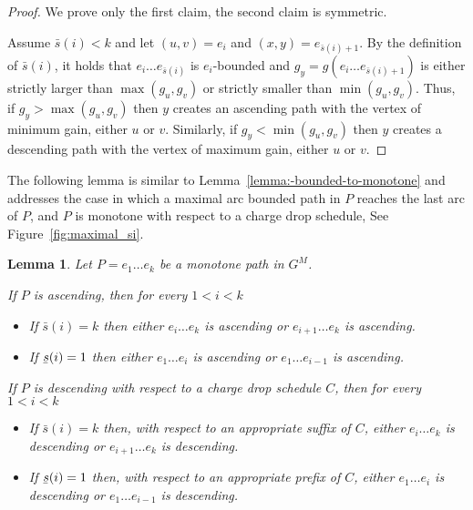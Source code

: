 \documentclass[11pt]{article}
\newtheorem{lemma}[theorem]{Lemma}
\newcommand{\ubar}[1]{\underaccent{\bar}{{#1}}}
\begin{document}
\begin{proof}
    We prove only the first claim, the second claim is symmetric.
    
    Assume $\bar{s}(i) < k$ and let $(u,v)=e_i$ and $(x,y) = e_{\bar{s}(i)+1}$. By the definition of $\bar{s}(i)$, it holds that $e_i \ldots e_{\bar{s}(i)}$ is $e_i$-bounded and $g_{y} = g(e_i \ldots e_{\bar{s}(i)+1})$ is either strictly larger than $\max( g_{u},g_{v})$ or strictly smaller than $\min( g_{u},g_{v})$. Thus, if $g_{y}> \max( g_{u},g_{v})$ then $y$ creates an ascending path with the vertex of minimum gain, either $u$ or $v$. Similarly, if $g_{y}< \min( g_{u},g_{v})$ then $y$ creates a descending path with the vertex of maximum gain, either $u$ or $v$.
\end{proof}

The following lemma is similar to Lemma~\ref{lemma:-bounded-to-monotone} and addresses the case in which a maximal arc bounded path in $P$ reaches the last arc of $P$, and $P$ is monotone with respect to a charge drop schedule, See Figure~\ref{fig:maximal_si}.


\begin{lemma}\label{lemma:-bounded-to-monotone_v2}
    Let $P = e_1 \ldots e_k$ be a monotone path in $G^M$.

    If $P$ is ascending, then for every $1<i<k$
    \begin{itemize}
        \item If $\bar{s}(i) = k$ then either $e_i \ldots e_{k}$ is ascending or $e_{i+1} \ldots e_{k}$ is ascending.
        \item If $\ubar{s}(i) = 1$ then either $e_{1}\ldots e_i$ is ascending or $e_{1} \ldots e_{i-1}$ is ascending.
    \end{itemize}
    
    If $P$ is descending  with respect to a charge drop schedule $C$, then for every $1<i<k$ 
    
    \begin{itemize}
        \item If $\bar{s}(i) = k$ then, with respect to an appropriate suffix of $C$, either $e_i \ldots e_{k}$ is descending or $e_{i+1} \ldots e_{k}$ is descending.
        \item If $\ubar{s}(i) = 1$ then, with respect to an appropriate prefix of  $C$, either $e_{1}\ldots e_i$ is descending or $e_{1} \ldots e_{i-1}$ is descending.
    \end{itemize}
\end{lemma}
\end{document}
